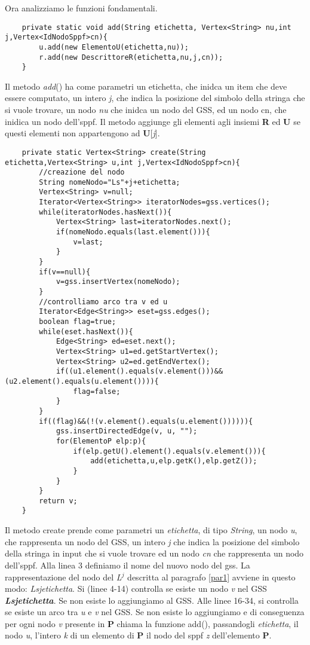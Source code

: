 Ora analizziamo le funzioni fondamentali.
\begin{lstlisting}
	private static void add(String etichetta, Vertex<String> nu,int j,Vertex<IdNodoSppf>cn){
		u.add(new ElementoU(etichetta,nu));
		r.add(new DescrittoreR(etichetta,nu,j,cn));
	}
\end{lstlisting}
Il metodo \textit{add}() ha come parametri un etichetta, che inidca un item che deve essere computato, un intero \textit{j}, che indica la posizione del simbolo della stringa che si vuole trovare, un nodo \textit{nu} che inidca un nodo del GSS, ed un nodo cn, che inidica un nodo dell'sppf. Il metodo aggiunge gli elementi agli insiemi \textbf{R} ed \textbf{U} se questi elementi non appartengono ad \textbf{U}[\textit{j}].
\begin{lstlisting}
	private static Vertex<String> create(String etichetta,Vertex<String> u,int j,Vertex<IdNodoSppf>cn){
		//creazione del nodo
		String nomeNodo="Ls"+j+etichetta;
		Vertex<String> v=null;
		Iterator<Vertex<String>> iteratorNodes=gss.vertices();
		while(iteratorNodes.hasNext()){
			Vertex<String> last=iteratorNodes.next();
			if(nomeNodo.equals(last.element())){
				v=last;
			}
		}
		if(v==null){
			v=gss.insertVertex(nomeNodo);
		}
		//controlliamo arco tra v ed u
		Iterator<Edge<String>> eset=gss.edges();
		boolean flag=true;
		while(eset.hasNext()){
			Edge<String> ed=eset.next();
			Vertex<String> u1=ed.getStartVertex();
			Vertex<String> u2=ed.getEndVertex();
			if((u1.element().equals(v.element()))&&(u2.element().equals(u.element()))){
				flag=false;
			}
		}
		if((flag)&&(!(v.element().equals(u.element()))))){
			gss.insertDirectedEdge(v, u, "");
			for(ElementoP elp:p){
				if(elp.getU().element().equals(v.element())){
					add(etichetta,u,elp.getK(),elp.getZ());
				}
			}
		}
		return v;
	}
\end{lstlisting}
Il metodo create prende come parametri un \textit{etichetta}, di tipo \textit{String}, un nodo \textit{u}, che rappresenta un nodo del GSS, un intero \textit{j} che indica la posizione del simbolo della stringa in input che si vuole trovare ed un nodo \textit{cn} che rappresenta un nodo dell'sppf. Alla linea 3 definiamo il nome del nuovo nodo del gss. La rappresentazione del nodo del \textit{L}$^{j}$ descritta al paragrafo \ref{par1} avviene in questo modo: \textit{Ls}\textit{j}\textit{etichetta}. Si (linee 4-14) controlla se esiste un nodo \textit{v} nel GSS \textbf{\textit{Ls}\textit{j}\textit{etichetta}}. Se non esiste lo aggiungiamo al GSS. Alle linee 16-34, si controlla se esiste un arco tra \textit{u} e \textit{v} nel GSS. Se non esiste lo aggiungiamo e di conseguenza per ogni nodo \textit{v} presente in \textbf{P} chiama la funzione add(), passandogli \textit{etichetta}, il nodo \textit{u}, l'intero \textit{k} di un elemento di \textbf{P} il nodo del sppf \textit{z} dell'elemento \textbf{P}.
